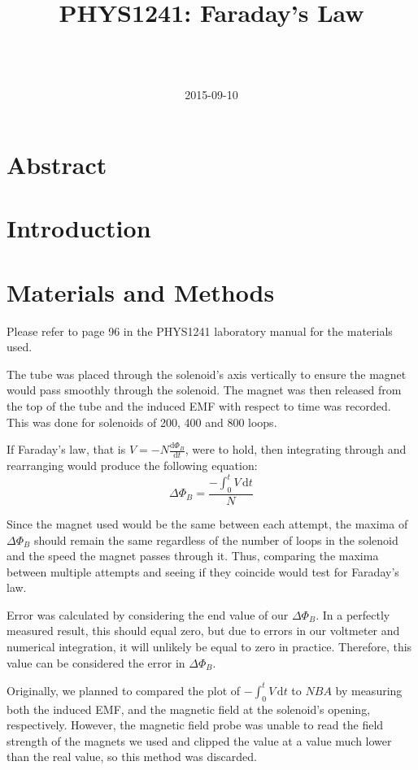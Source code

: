 \documentclass[a4paper]{scrartcl}
\begin{document}
\title{PHYS1241: Faraday's Law}
\author{ \\ \\ }
\date{2015-09-10}
\maketitle

\section{Abstract}

\section{Introduction}

\section{Materials and Methods}
Please refer to page 96 in the PHYS1241 laboratory manual for the materials used.

The tube was placed through the solenoid's axis vertically to ensure the magnet would pass smoothly through the solenoid. The magnet was then released from the top of the tube and the induced EMF with respect to time was recorded. This was done for solenoids of 200, 400 and 800 loops.

If Faraday's law, that is \(V = -N \frac{\mathrm{d}\Phi_B}{\mathrm{d}t}\), were to hold, then integrating through and rearranging would produce the following equation:
\[\Delta\Phi_B = \frac{-\int_0^t V \,\mathrm{d}t}{N}\]

Since the magnet used would be the same between each attempt, the maxima of \(\Delta\Phi_B\) should remain the same regardless of the number of loops in the solenoid and the speed the magnet passes through it. Thus, comparing the maxima between multiple attempts and seeing if they coincide would test for Faraday's law.

Error was calculated by considering the end value of our \(\Delta\Phi_B\). In a perfectly measured result, this should equal zero, but due to errors in our voltmeter and numerical integration, it will unlikely be equal to zero in practice. Therefore, this value can be considered the error in \(\Delta\Phi_B\).

Originally, we planned to compared the plot of \(-\int_0^t V \,\mathrm{d}t\) to \(N B A\) by measuring both the induced EMF, and the magnetic field at the solenoid's opening, respectively. However, the magnetic field probe was unable to read the field strength of the magnets we used and clipped the value at a value much lower than the real value, so this method was discarded.
\end{document}
